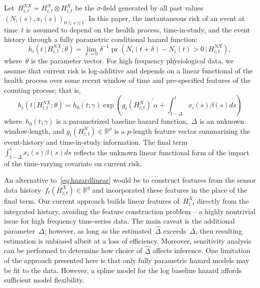 \documentclass[12pt]{amsart}
\def\pr{\mathop{\text{pr}}\nolimits}
\def\pr{\mathop{\text{pr}}\nolimits}
\def\given{\, | \,}
\def\Given{\, \big | \,}
\begin{document}
Let~$H_{i,t}^{NX} = H_{i,t}^{N} \otimes H_{i,t}^{X}$ be the $\sigma$-field generated by all past values~$(N_i (s), x_i (s))_{0 \leq s \leq t}$. In this paper, the instantaneous risk of an event at time~$t$ is assumed to depend on the health process, time-in-study, and the event history through a fully parametric conditional hazard function:
\begin{equation}
\label{eq:hazard}
h_i \left( t \Given H_{i,t}^{NX} ; \theta \right) =
\lim_{\delta \to 0} \delta^{-1} \pr \left( N_i(t+\delta) - N_i(t) > 0
  \given H_{i,t}^{NX} \right),
\end{equation}
where~$\theta$ is the parameter vector. For high frequency physiological data, we assume that current risk is log-additive and depends on a linear functional of the health process over some recent window of time and pre-specified features of the counting process; that is,
\begin{equation}
\label{eq:hazardlinear}
h_i \left( t \given  H_{i,t}^{NX} ; \theta \right) =
h_0 (t; \gamma) \exp \left( g_t \left( H_{i,t}^{N} \right)^{\prime} \alpha
  + \int_{t-\Delta}^t x_i (s) \beta(s) ds  \right)
\end{equation}
where~$h_0(t;\gamma)$ is a parametrized baseline hazard function,~$\Delta$ is an unknown window-length, and $g_t( H_{i,t}^N ) \in \mathbb{R}^p$ is a $p$-length feature vector summarizing the event-history and time-in-study information. The final term~$\int_{t-\Delta}^t x_i(s) \beta(s) ds$ reflects the unknown linear functional form of the impact of the time-varying covariate on current risk.

An alternative to~\eqref{eq:hazardlinear} would be to construct features from the sensor data history~$f_t ( H_{i,t}^{X}) \in \mathbb{R}^q$ and incorporated these features in the place of the final term. Our current approach builds linear features of~$H_{i,t}^X$ directly from the integrated history, avoiding the feature construction problem -- a highly nontrivial issue for high frequency time-series data.  The main caveat is the additional parameter~$\Delta$; however, as long as the estimated~$\hat \Delta$ exceeds~$\Delta$, then resulting estimation is unbiased albeit at a loss of efficiency.  Moreover, sensitivity analysis can be performed to determine how choice of $\hat \Delta$ affects inference.  One limitation of the approach presented here is that only fully parametric hazard models may be fit to the data. However, a spline model for the log baseline hazard affords sufficient model flexibility.
\end{document}
